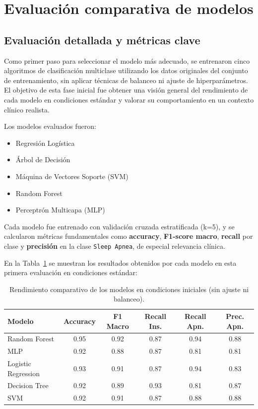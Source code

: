 \label{cap:resultados}

\section{Evaluación comparativa de modelos}
\label{sec:evaluacion_modelos}

\subsection{Evaluación detallada y métricas clave}

Como primer paso para seleccionar el modelo más adecuado, se entrenaron cinco algoritmos de clasificación multiclase utilizando los datos originales del conjunto de entrenamiento, sin aplicar técnicas de balanceo ni ajuste de hiperparámetros. El objetivo de esta fase inicial fue obtener una visión general del rendimiento de cada modelo en condiciones estándar y valorar su comportamiento en un contexto clínico realista.

Los modelos evaluados fueron:

\begin{itemize}
    \item Regresión Logística
    \item Árbol de Decisión
    \item Máquina de Vectores Soporte (SVM)
    \item Random Forest
    \item Perceptrón Multicapa (MLP)
\end{itemize}

Cada modelo fue entrenado con validación cruzada estratificada (k=5), y se calcularon métricas fundamentales como \textbf{accuracy}, \textbf{F1-score macro}, \textbf{recall} por clase y \textbf{precisión} en la clase \texttt{Sleep Apnea}, de especial relevancia clínica.

En la Tabla~\ref{tab:comparativa-inicial} se muestran los resultados obtenidos por cada modelo en esta primera evaluación en condiciones estándar:

\begin{table}[H]
\centering
\small 
\begin{tabular}{lccccc}
\toprule
\textbf{Modelo} & \textbf{Accuracy} & \textbf{F1 Macro} & \textbf{Recall Ins.} & \textbf{Recall Apn.} & \textbf{Prec. Apn.} \\
\midrule
Random Forest       & 0.95 & 0.92 & 0.87 & 0.94 & 0.88 \\
MLP                 & 0.92 & 0.88 & 0.87 & 0.81 & 0.81 \\
Logistic Regression & 0.93 & 0.91 & 0.87 & 0.94 & 0.83 \\
Decision Tree       & 0.92 & 0.89 & 0.93 & 0.81 & 0.87 \\
SVM                 & 0.92 & 0.91 & 0.87 & 0.88 & 0.88 \\
\bottomrule
\end{tabular}
\caption{Rendimiento comparativo de los modelos en condiciones iniciales (sin ajuste ni balanceo).}
\label{tab:comparativa-inicial}
\end{table}

